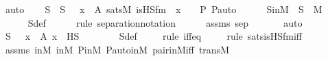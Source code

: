 \begin{isabellebody}
\ auto\isanewline
\isanewline
\ \ \isamarkupfalse%
\ S\ \ {\isachardoublequoteopen}S\ {\isasymequiv}\ {\isacharbraceleft}{\kern0pt}\ x\ {\isasymin}\ A{\isachardot}{\kern0pt}\ sats{\isacharparenleft}{\kern0pt}M{\isacharcomma}{\kern0pt}\ is{\isacharunderscore}{\kern0pt}HS{\isacharunderscore}{\kern0pt}fm{\isacharparenleft}{\kern0pt}{}{\isacharcomma}{\kern0pt}\ {}{\isacharparenright}{\kern0pt}{\isacharcomma}{\kern0pt}\ {\isacharbrackleft}{\kern0pt}x{\isacharbrackright}{\kern0pt}\ {\isacharat}{\kern0pt}\ {\isacharbrackleft}{\kern0pt}{\isacharless}{\kern0pt}{\isasymF}{\isacharcomma}{\kern0pt}\ {\isasymG}{\isacharcomma}{\kern0pt}\ P{\isacharcomma}{\kern0pt}\ P{\isacharunderscore}{\kern0pt}auto{\isachargreater}{\kern0pt}{\isacharbrackright}{\kern0pt}{\isacharparenright}{\kern0pt}\ {\isacharbraceright}{\kern0pt}{\isachardoublequoteclose}\ \isanewline
\ \ \isamarkupfalse%
\ SinM\ {\isacharcolon}{\kern0pt}\ {\isachardoublequoteopen}S\ {\isasymin}\ M{\isachardoublequoteclose}\ \isanewline
\ \ \ \ \isamarkupfalse%
\ S{\isacharunderscore}{\kern0pt}def\ \isanewline
\ \ \ \ \isamarkupfalse%
{\isacharparenleft}{\kern0pt}rule\ separation{\isacharunderscore}{\kern0pt}notation{\isacharparenright}{\kern0pt}\isanewline
\ \ \ \ \isamarkupfalse%
\ assms\ sep\ \isanewline
\ \ \ \ \isamarkupfalse%
\ auto\isanewline
\isanewline
\ \ \isamarkupfalse%
\ {\isachardoublequoteopen}S\ {\isacharequal}{\kern0pt}\ {\isacharbraceleft}{\kern0pt}\ x\ {\isasymin}\ A{\isachardot}{\kern0pt}\ x\ {\isasymin}\ HS\ {\isacharbraceright}{\kern0pt}{\isachardoublequoteclose}\ \isanewline
\ \ \ \ \isamarkupfalse%
\ S{\isacharunderscore}{\kern0pt}def\isanewline
\ \ \ \ \isamarkupfalse%
{\isacharparenleft}{\kern0pt}rule\ iff{\isacharunderscore}{\kern0pt}eq{\isacharparenright}{\kern0pt}\isanewline
\ \ \ \ \isamarkupfalse%
{\isacharparenleft}{\kern0pt}rule\ sats{\isacharunderscore}{\kern0pt}is{\isacharunderscore}{\kern0pt}HS{\isacharunderscore}{\kern0pt}fm{\isacharunderscore}{\kern0pt}iff{\isacharparenright}{\kern0pt}\isanewline
\ \ \ \ \isamarkupfalse%
\ assms\ {\isasymF}{\isacharunderscore}{\kern0pt}in{\isacharunderscore}{\kern0pt}M\ {\isasymG}{\isacharunderscore}{\kern0pt}in{\isacharunderscore}{\kern0pt}M\ P{\isacharunderscore}{\kern0pt}in{\isacharunderscore}{\kern0pt}M\ P{\isacharunderscore}{\kern0pt}auto{\isacharunderscore}{\kern0pt}in{\isacharunderscore}{\kern0pt}M\ pair{\isacharunderscore}{\kern0pt}in{\isacharunderscore}{\kern0pt}M{\isacharunderscore}{\kern0pt}iff\ transM\isanewline

\end{isabellebody}
